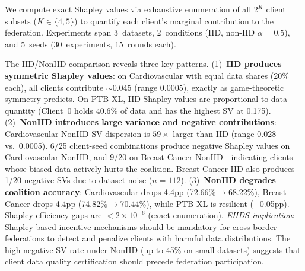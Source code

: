 \documentclass[conference]{IEEEtran}
\begin{document}
We compute exact Shapley values via exhaustive enumeration of all $2^K$ client subsets ($K \in \{4, 5\}$) to quantify each client's marginal contribution to the federation. Experiments span 3~datasets, 2~conditions (IID, non-IID $\alpha{=}0.5$), and 5~seeds (30~experiments, 15~rounds each).

\begin{table}[htbp]
\centering
\caption{Shapley Values: Mean Client Contributions (5 seeds, $\pm$ std)}
\label{tab:shapley_values}

\vspace{1mm}
\footnotesize{The IID/NonIID comparison reveals three key patterns. (1)~\textbf{IID produces symmetric Shapley values}: on Cardiovascular with equal data shares (20\% each), all clients contribute $\sim$0.045 (range 0.0005), exactly as game-theoretic symmetry predicts. On PTB-XL, IID Shapley values are proportional to data quantity (Client~0 holds 40.6\% of data and has the highest SV at 0.175). (2)~\textbf{NonIID introduces large variance and negative contributions}: Cardiovascular NonIID SV dispersion is $59\times$ larger than IID (range 0.028 vs.\ 0.0005). 6/25 client-seed combinations produce negative Shapley values on Cardiovascular NonIID, and 9/20 on Breast Cancer NonIID---indicating clients whose biased data actively hurts the coalition. Breast Cancer IID also produces 1/20 negative SVs due to dataset noise ($n{=}112$). (3)~\textbf{NonIID degrades coalition accuracy}: Cardiovascular drops 4.4pp (72.66\%$\to$68.22\%), Breast Cancer drops 4.4pp (74.82\%$\to$70.44\%), while PTB-XL is resilient ($-$0.05pp). Shapley efficiency gaps are $<2 \times 10^{-6}$ (exact enumeration). \textit{EHDS implication}: Shapley-based incentive mechanisms should be mandatory for cross-border federations to detect and penalize clients with harmful data distributions. The high negative-SV rate under NonIID (up to 45\% on small datasets) suggests that client data quality certification should precede federation participation.}
\end{table}
\end{document}

